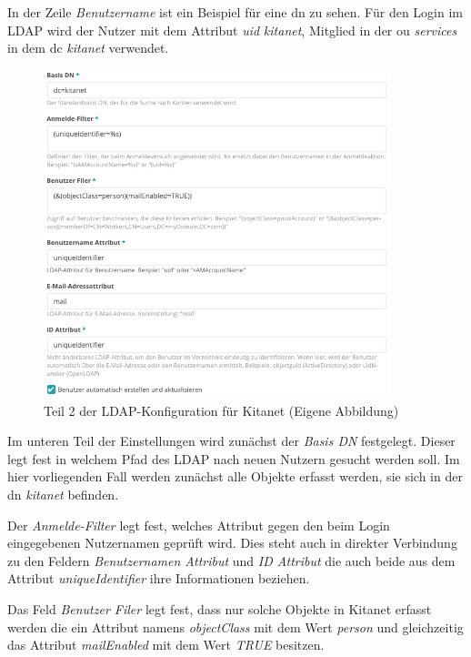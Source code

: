 In der Zeile \textit{Benutzername} ist ein Beispiel für eine \ac{dn} zu sehen. Für den Login im LDAP wird der Nutzer mit dem Attribut \textit{uid} \textit{kitanet}, Mitglied in der \ac{ou} \textit{services} in dem \ac{dc} \textit{kitanet} verwendet.

\begin{figure}[H]
  \centering
  \includegraphics[width=0.9\textwidth]{res/ldapkitanet2.png}
  \caption{Teil 2 der LDAP-Konfiguration für Kitanet (Eigene Abbildung)}
  \label{fig:LDAP Kitanet Teil 2}
\end{figure}

Im unteren Teil der Einstellungen wird zunächst der \textit{Basis DN} festgelegt. Dieser legt fest in welchem Pfad des LDAP nach neuen Nutzern gesucht werden soll. Im hier vorliegenden Fall werden zunächst alle Objekte erfasst werden, sie sich in der \ac{dn} \textit{kitanet} befinden.

Der \textit{Anmelde-Filter} legt fest, welches Attribut gegen den beim Login eingegebenen Nutzernamen geprüft wird. Dies steht auch in direkter Verbindung zu den Feldern \textit{Benutzernamen Attribut} und \textit{ID Attribut} die auch beide aus dem Attribut \textit{uniqueIdentifier} ihre Informationen beziehen. 

Das Feld \textit{Benutzer Filer} legt fest, dass nur solche Objekte in Kitanet erfasst werden die ein Attribut namens \textit{objectClass} mit dem Wert \textit{person} und gleichzeitig das Attribut \textit{mailEnabled} mit dem Wert \textit{TRUE} besitzen.

